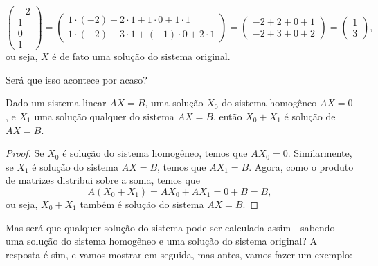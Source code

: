 \begin{ex}
\[\begin{pmatrix}
-2\\1\\0\\1
\end{pmatrix}=\begin{pmatrix}
1\cdot(-2)+2\cdot 1+1\cdot 0+1\cdot1\\
1\cdot(-2)+3\cdot1+(-1)\cdot 0+2\cdot1
\end{pmatrix}=\begin{pmatrix}
-2+2+0+1\\-2+3+0+2
\end{pmatrix}=\begin{pmatrix}
1\\3
\end{pmatrix},\]ou seja, $X$ é de fato uma solução do sistema original.

Será que isso acontece por acaso?
\end{ex}

\begin{prop}
	Dado um sistema linear $AX=B$, uma solução $X_0$ do sistema homogêneo $AX=0$, e $X_1$ uma solução qualquer do sistema $AX=B$, então $X_0+X_1$ é solução de $AX=B$.
\end{prop}
\begin{proof}
	Se $X_0$ é solução do sistema homogêneo, temos que $AX_0=0$. Similarmente, se $X_1$ é solução do sistema $AX=B$, temos que $AX_1=B$. Agora, como o produto de matrizes distribui sobre a soma, temos que
	\[A(X_0+X_1)=AX_0+AX_1=0+B=B,\] ou seja, $X_0+X_1$ também é solução do sistema $AX=B$.
\end{proof}

Mas será que qualquer solução do sistema pode ser calculada assim - sabendo uma solução do sistema homogêneo e uma solução do sistema original? A resposta é sim, e vamos mostrar em seguida, mas antes, vamos fazer um exemplo:

